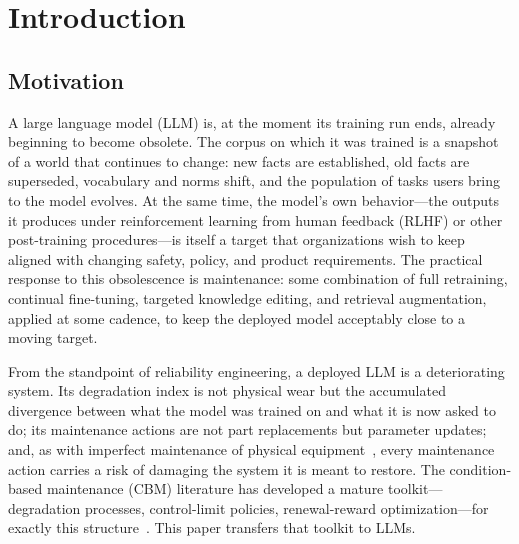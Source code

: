 \documentclass[electronics,article,submit,pdftex,moreauthors]{Definitions/mdpi}
\begin{document}
\section{Introduction}

\subsection{Motivation}

A large language model (LLM) is, at the moment its training run ends, already beginning to become obsolete. The corpus on which it was trained is a snapshot of a world that continues to change: new facts are established, old facts are superseded, vocabulary and norms shift, and the population of tasks users bring to the model evolves. At the same time, the model's own behavior---the outputs it produces under reinforcement learning from human feedback (RLHF) or other post-training procedures---is itself a target that organizations wish to keep aligned with changing safety, policy, and product requirements. The practical response to this obsolescence is maintenance: some combination of full retraining, continual fine-tuning, targeted knowledge editing, and retrieval augmentation, applied at some cadence, to keep the deployed model acceptably close to a moving target.

From the standpoint of reliability engineering, a deployed LLM is a deteriorating system. Its degradation index is not physical wear but the accumulated divergence between what the model was trained on and what it is now asked to do; its maintenance actions are not part replacements but parameter updates; and, as with imperfect maintenance of physical equipment~\cite{Pham1996}, every maintenance action carries a risk of damaging the system it is meant to restore. The condition-based maintenance (CBM) literature has developed a mature toolkit---degradation processes, control-limit policies, renewal-reward optimization---for exactly this structure~\cite{Jardine2006,vanNoortwijk2009,Wang2002}. This paper transfers that toolkit to LLMs.
\end{document}
